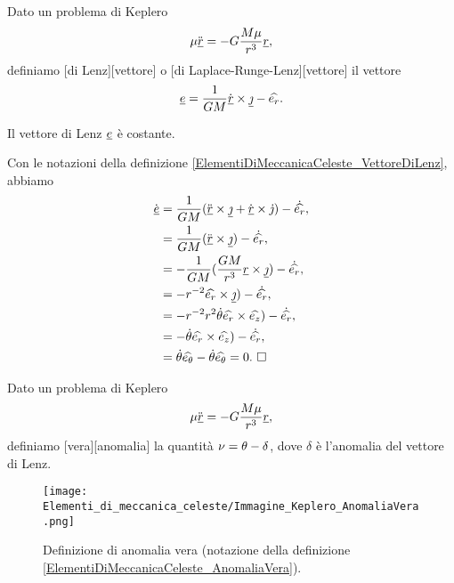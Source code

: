 \begin{Definition}
	\label{ElementiDiMeccanicaCeleste_VettoreDiLenz}
	Dato un problema di Keplero
	\[
		\mu \ddot{\underline{r}} = - G \frac{M\mu}{r^3}\underline{r},
	\]
	definiamo [di Lenz][vettore] o [di Laplace-Runge-Lenz][vettore] il vettore
	\[
		\underline{e} = \frac{1}{GM} \dot{\underline{r}} \times \underline{\jmath} - \widehat{e_r}.
	\]
\end{Definition}
\begin{Theorem}
	Il vettore di Lenz $\underline{e}$ \`e costante.
\end{Theorem}
\Proof Con le notazioni della definizione \ref{ElementiDiMeccanicaCeleste_VettoreDiLenz}, abbiamo
\begin{align*}
	\dot{\underline{e}}
	&= \frac{1}{G M} (\ddot{\underline{r}} \times \underline{\jmath} + \dot{\underline{r}} \times \dot{\jmath}) - \dot{\widehat{e_r}},\\
	&= \frac{1}{G M} (\ddot{\underline{r}} \times \underline{\jmath}) - \dot{\widehat{e_r}},\\
	&= - \frac{1}{G M} (\frac{GM}{r^3}\underline{r} \times \underline{\jmath}) - \dot{\widehat{e_r}},\\
	&= - r^{-2} \widehat{e_r} \times \underline{\jmath}) - \dot{\widehat{e_r}},\\
	&= - r^{-2} r^2 \dot{\theta} \widehat{e_r} \times \widehat{e_z}) - \dot{\widehat{e_r}},\\
	&= - \dot{\theta} \widehat{e_r} \times \widehat{e_z}) - \dot{\widehat{e_r}},\\
	&= \dot{\theta} \widehat{e_\theta} - \dot{\theta}\widehat{e_\theta} = 0.\text{ $\square$}
\end{align*}
\begin{Definition}
	\label{ElementiDiMeccanicaCeleste_AnomaliaVera}
	Dato un problema di Keplero
	\[
		\mu \ddot{\underline{r}} = - G \frac{M\mu}{r^3}\underline{r},
	\]
	definiamo [vera][anomalia] la quantit\`a $\nu = \theta - \delta$, dove $\delta$ \`e l'anomalia del vettore di Lenz.
\end{Definition}
\begin{figure}
	\texttt{[image: Elementi\_di\_meccanica\_celeste/Immagine\_Keplero\_AnomaliaVera.png]}
	\centering
	\caption{Definizione di anomalia vera (notazione della definizione \ref{ElementiDiMeccanicaCeleste_AnomaliaVera}).}
\end{figure}
